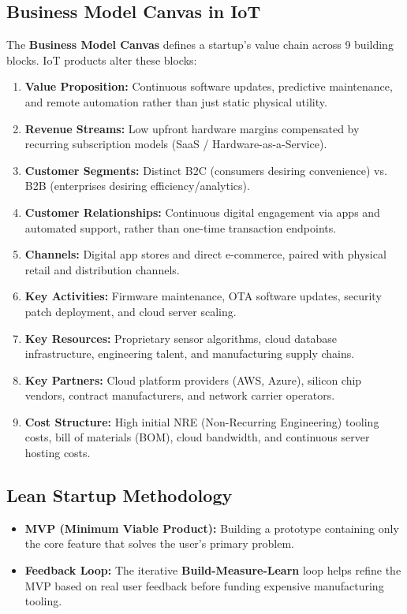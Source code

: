 \documentclass[12pt,a4paper]{article}
\begin{document}
\subsection{Business Model Canvas in IoT}
The \textbf{Business Model Canvas} defines a startup's value chain across 9 building blocks. IoT products alter these blocks:
\begin{enumerate}[leftmargin=*, itemsep=3.0pt]
  \item \textbf{Value Proposition:} Continuous software updates, predictive maintenance, and remote automation rather than just static physical utility.
  \item \textbf{Revenue Streams:} Low upfront hardware margins compensated by recurring subscription models (SaaS / Hardware-as-a-Service).
  \item \textbf{Customer Segments:} Distinct B2C (consumers desiring convenience) vs. B2B (enterprises desiring efficiency/analytics).
  \item \textbf{Customer Relationships:} Continuous digital engagement via apps and automated support, rather than one-time transaction endpoints.
  \item \textbf{Channels:} Digital app stores and direct e-commerce, paired with physical retail and distribution channels.
  \item \textbf{Key Activities:} Firmware maintenance, OTA software updates, security patch deployment, and cloud server scaling.
  \item \textbf{Key Resources:} Proprietary sensor algorithms, cloud database infrastructure, engineering talent, and manufacturing supply chains.
  \item \textbf{Key Partners:} Cloud platform providers (AWS, Azure), silicon chip vendors, contract manufacturers, and network carrier operators.
  \item \textbf{Cost Structure:} High initial NRE (Non-Recurring Engineering) tooling costs, bill of materials (BOM), cloud bandwidth, and continuous server hosting costs.
\end{enumerate}

\subsection{Lean Startup Methodology}
\begin{itemize}[leftmargin=*, itemsep=3pt]
  \item \textbf{MVP (Minimum Viable Product):} Building a prototype containing only the core feature that solves the user's primary problem.
  \item \textbf{Feedback Loop:} The iterative \textbf{Build-Measure-Learn} loop helps refine the MVP based on real user feedback before funding expensive manufacturing tooling.
\end{itemize}
\end{document}
